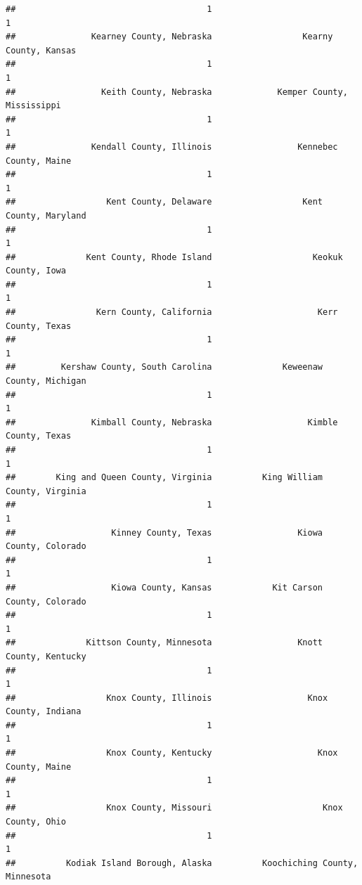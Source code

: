 \documentclass[
]{article}
\begin{document}
\begin{verbatim}
##                                      1                                      1 
##               Kearney County, Nebraska                  Kearny County, Kansas 
##                                      1                                      1 
##                 Keith County, Nebraska             Kemper County, Mississippi 
##                                      1                                      1 
##               Kendall County, Illinois                 Kennebec County, Maine 
##                                      1                                      1 
##                  Kent County, Delaware                  Kent County, Maryland 
##                                      1                                      1 
##              Kent County, Rhode Island                    Keokuk County, Iowa 
##                                      1                                      1 
##                Kern County, California                     Kerr County, Texas 
##                                      1                                      1 
##         Kershaw County, South Carolina              Keweenaw County, Michigan 
##                                      1                                      1 
##               Kimball County, Nebraska                   Kimble County, Texas 
##                                      1                                      1 
##        King and Queen County, Virginia          King William County, Virginia 
##                                      1                                      1 
##                   Kinney County, Texas                 Kiowa County, Colorado 
##                                      1                                      1 
##                   Kiowa County, Kansas            Kit Carson County, Colorado 
##                                      1                                      1 
##              Kittson County, Minnesota                 Knott County, Kentucky 
##                                      1                                      1 
##                  Knox County, Illinois                   Knox County, Indiana 
##                                      1                                      1 
##                  Knox County, Kentucky                     Knox County, Maine 
##                                      1                                      1 
##                  Knox County, Missouri                      Knox County, Ohio 
##                                      1                                      1 
##          Kodiak Island Borough, Alaska          Koochiching County, Minnesota 

\end{verbatim}
\end{document}
